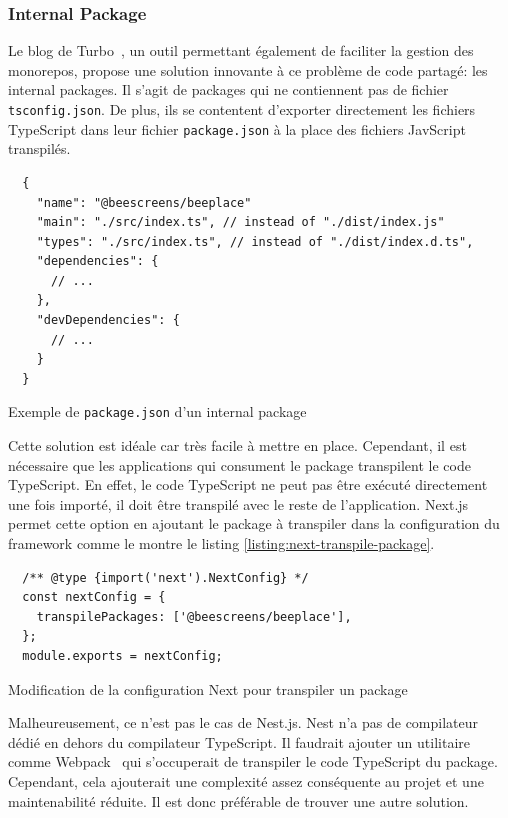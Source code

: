 \subsubsection{Internal Package}

Le blog de Turbo~\cite{you-might-not-need-typescript-project-references}, un outil permettant également de faciliter la gestion des monorepos, propose une solution innovante à ce problème de code partagé: les internal packages. Il s'agit de packages qui ne contiennent pas de fichier \texttt{tsconfig.json}. De plus, ils se contentent d'exporter directement les fichiers TypeScript dans leur fichier \texttt{package.json} à la place des fichiers JavScript transpilés.

\begin{listing}[H]
  \begin{verbatim}
  {
    "name": "@beescreens/beeplace"
    "main": "./src/index.ts", // instead of "./dist/index.js"
    "types": "./src/index.ts", // instead of "./dist/index.d.ts",
    "dependencies": {
      // ...
    },
    "devDependencies": {
      // ...
    }
  }
\end{verbatim}
  \caption{Exemple de \texttt{package.json} d'un internal package}
  \label{listing:internal-package-json}
\end{listing}

Cette solution est idéale car très facile à mettre en place. Cependant, il est nécessaire que les applications qui consument le package transpilent le code TypeScript. En effet, le code TypeScript ne peut pas être exécuté directement une fois importé, il doit être transpilé avec le reste de l'application. Next.js permet cette option en ajoutant le package à transpiler dans la configuration du framework comme le montre le listing \ref{listing:next-transpile-package}.

\begin{listing}[H]
  \begin{verbatim}
  /** @type {import('next').NextConfig} */
  const nextConfig = {
    transpilePackages: ['@beescreens/beeplace'],
  };
  module.exports = nextConfig;
\end{verbatim}
  \caption{Modification de la configuration Next pour transpiler un package}
  \label{listing:next-transpile-package}
\end{listing}

Malheureusement, ce n'est pas le cas de Nest.js. Nest n'a pas de compilateur dédié en dehors du compilateur TypeScript. Il faudrait ajouter un utilitaire comme Webpack~\cite{webpack} qui s'occuperait de transpiler le code TypeScript du package. Cependant, cela ajouterait une complexité assez conséquente au projet et une maintenabilité réduite. Il est donc préférable de trouver une autre solution.

